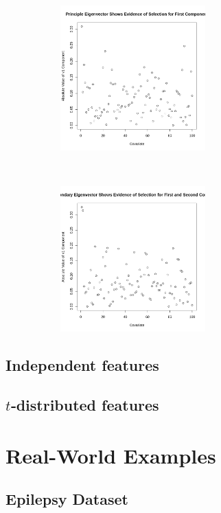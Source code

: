 \documentclass[12pt]{article}
\begin{document}
\begin{figure}[t!]
    \begin{subfigure}[t]{0.45\textwidth}
        \centering
        \includegraphics[height=2.2in]{figures/complexfirst.png}
        \caption{}
    \end{subfigure}
    ~
    \begin{subfigure}[t]{0.45\textwidth}
        \centering
        \includegraphics[height=2.2in]{figures/complexsecond.png}
        \caption{}
    \end{subfigure}
\caption{}
\end{figure}

\subsection{Independent features}

\subsection{$t$‐distributed features}

\section{Real-World Examples}

\subsection{Epilepsy Dataset}
\end{document}
